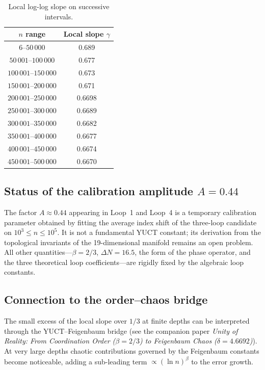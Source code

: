 \documentclass[12pt,a4paper]{article}
\begin{document}
	\begin{table}[htbp]
		\centering
		\caption{Local log-log slope on successive intervals.}
		\label{tab:local-slopes}
		\begin{tabular}{c c}
			\toprule
			\(n\) range & Local slope \(\gamma\) \\
			\midrule
			\(6\)--\(50\,000\)    & 0.689 \\
			\(50\,001\)--\(100\,000\) & 0.677 \\
			\(100\,001\)--\(150\,000\)& 0.673 \\
			\(150\,001\)--\(200\,000\)& 0.671 \\
			\(200\,001\)--\(250\,000\)& 0.6698 \\
			\(250\,001\)--\(300\,000\)& 0.6689 \\
			\(300\,001\)--\(350\,000\)& 0.6682 \\
			\(350\,001\)--\(400\,000\)& 0.6677 \\
			\(400\,001\)--\(450\,000\)& 0.6674 \\
			\(450\,001\)--\(500\,000\)& 0.6670 \\
			\bottomrule
		\end{tabular}
	\end{table}
	
	\subsection{Status of the calibration amplitude \(A=0.44\)}
	The factor \(A \approx 0.44\) appearing in Loop~1 and Loop~4 is a temporary calibration parameter obtained by fitting the average index shift of the three-loop candidate on \(10^3\le n\le 10^5\).  It is not a fundamental YUCT constant; its derivation from the topological invariants of the 19-dimensional manifold remains an open problem.  All other quantities---\(\beta=2/3\), \(\Delta N=16.5\), the form of the phase operator, and the three theoretical loop coefficients---are rigidly fixed by the algebraic loop constants.
	
	\subsection{Connection to the order--chaos bridge}
	The small excess of the local slope over \(1/3\) at finite depths can be interpreted through the YUCT--Feigenbaum bridge (see the companion paper \emph{Unity of Reality: From Coordination Order (\(\beta=2/3\)) to Feigenbaum Chaos (\(\delta=4.6692\))}).  At very large depths chaotic contributions governed by the Feigenbaum constants become noticeable, adding a sub-leading term \(\propto (\ln n)^{\beta}\) to the error growth.
	
\end{document}
